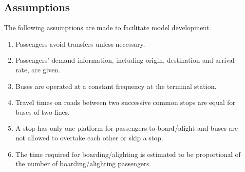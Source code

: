 \documentclass[smallextended]{svjour3}       %
\begin{document}
\begin{Abstract}
\subsection{Assumptions}
The following assumptions are made to facilitate model development.
\begin{enumerate}[{A}1)]
    \item\label{A: avoid transfer} Passengers avoid transfers unless necessary. 
    \item\label{A: OD} Passengers' demand information, including origin, destination and arrival rate, are given.
    \item\label{A: constant supply and demand} Buses are operated at a constant frequency at the terminal station. 
    \item\label{A: T} Travel times on roads between two successive common stops are equal for buses of two lines.
    \item\label{A: FAFD} A stop has only one platform for passengers to board/alight and buses are not allowed to overtake each other or skip a stop. 
    \item\label{A: dwell time} The time required for boarding/alighting is estimated to be proportional of the number of boarding/alighting passengers.
\end{enumerate}


\end{Abstract}
\end{document}
